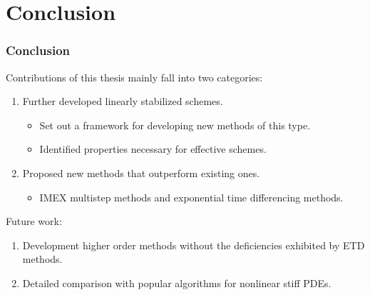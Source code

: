 \documentclass[hyperref={pdfpagelabels=false}]{beamer}
\begin{document}
\section{Conclusion}
\begin{frame}
	\frametitle{Conclusion}
	Contributions of this thesis mainly fall into two categories:
\begin{enumerate}
	\item Further developed linearly stabilized schemes.
	\begin{itemize}
		\item Set out a framework for developing new methods of this type. 
		
		\item Identified properties necessary for effective schemes. 
	\end{itemize}
	
	\item Proposed new methods that outperform existing ones. 
	\begin{itemize}
		\item IMEX multistep methods and exponential time differencing methods. 
	\end{itemize}
\end{enumerate}	

Future work: 
\begin{enumerate}
	\item Development higher order methods without the deficiencies exhibited by ETD methods.
	
	\item Detailed comparison with popular algorithms for nonlinear stiff PDEs.
\end{enumerate}
\end{frame}
\end{document}
